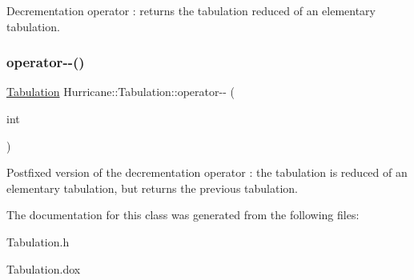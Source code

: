 Decrementation operator \+: returns the tabulation reduced of an elementary tabulation. \mbox{\label{classHurricane_1_1Tabulation_a9bdb9f81cd412ffcfb1da048b75cbd99}} 
\subsubsection{\texorpdfstring{operator-\/-\/()}{operator--()}\hspace{0.1cm}{\footnotesize\ttfamily [2/2]}}
{\footnotesize\ttfamily \hyperlink{classHurricane_1_1Tabulation}{Tabulation} Hurricane\+::\+Tabulation\+::operator-\/-\/ (\begin{DoxyParamCaption}\item[{int}]{ }\end{DoxyParamCaption})}

Postfixed version of the decrementation operator \+: the tabulation is reduced of an elementary tabulation, but returns the previous tabulation. 

The documentation for this class was generated from the following files\+:\begin{DoxyCompactItemize}
\item 
Tabulation.\+h\item 
Tabulation.\+dox\end{DoxyCompactItemize}
